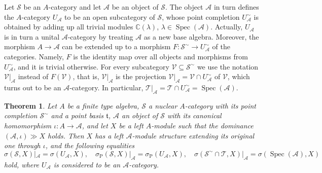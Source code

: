 \documentclass[12pt]{amsart}%
\newtheorem{theorem}{Theorem}
\theoremstyle{plain}
\numberwithin{equation}{section}
\numberwithin{equation}{section}
\numberwithin{theorem}{section}
\numberwithin{lemma}{section}
\numberwithin{remark}{section}
\numberwithin{example}{section}
\numberwithin{proposition}{section}
\numberwithin{definition}{section}
\numberwithin{corollary}{section}
\begin{document}
Let $\mathcal{S}$ be an $A$-category and let $\mathcal{A}$ be an object of
$\mathcal{S}$. The object $\mathcal{A}$ in turn defines the $A$-category
$U_{\mathcal{A}}$ to be an open subcategory of $\mathcal{S}$, whose point
completion $U_{\mathcal{A}}^{\sim}$ is obtained by adding up all trivial
modules $\mathbb{C}\left(  \lambda\right)  $, $\lambda\in\operatorname{Spec}%
\left(  \mathcal{A}\right)  $. Actually, $U_{\mathcal{A}}$ is in turn a unital
$\mathcal{A}$-category by treating $\mathcal{A}$ as a new base algebra.
Moreover, the morphism $A\rightarrow\mathcal{A}$ can be extended up to a
morphism $F:\mathcal{S}^{\sim}\rightarrow U_{\mathcal{A}}^{\sim}$ of the
categories. Namely, $F$ is the identity map over all objects and morphisms
from $U_{\mathcal{A}}^{\sim}$, and it is trivial otherwise. For every
subcategory $\mathcal{V\subseteq S}^{\sim}$ we use the notation $\mathcal{V}%
|_{\mathcal{A}}$ instead of $F\left(  \mathcal{V}\right)  $, that is,
$\mathcal{V}|_{\mathcal{A}}$ is the projection $\mathcal{V}|_{\mathcal{A}%
}=\mathcal{V}\cap U_{\mathcal{A}}^{\sim}$ of $\mathcal{V}$, which turns out to
be an $\mathcal{A}$-category. In particular, $\mathcal{T}|_{\mathcal{A}%
}=\mathcal{T}\cap U_{\mathcal{A}}^{\sim}=\operatorname{Spec}\left(
\mathcal{A}\right)  $.

\begin{theorem}
\label{thSMT}Let $A$ be a finite type algebra, $\mathcal{S}$ a nuclear
$A$-category with its point completion $\mathcal{S}^{\sim}$ and a point basis
$\mathfrak{t}$, $\mathcal{A}$ an object of $\mathcal{S}$ with its canonical
homomorphism $\iota:A\rightarrow\mathcal{A}$, and let $X$ be a left $A$-module
such that the dominance $\left(  \mathcal{A},\iota\right)  \gg X$ holds. Then
$X$ has a left $\mathcal{A}$-module structure extending its original one
through $\iota$, and the following equalities
\[
\sigma\left(  \mathcal{S},X\right)  |_{\mathcal{A}}=\sigma\left(
U_{\mathcal{A}},X\right)  ,\quad\sigma_{\operatorname{P}}\left(
\mathcal{S},X\right)  |_{\mathcal{A}}=\sigma_{\operatorname{P}}\left(
U_{\mathcal{A}},X\right)  ,\quad\sigma\left(  \mathcal{S}^{\sim}%
\cap\mathcal{T},X\right)  |_{\mathcal{A}}=\sigma\left(  \operatorname{Spec}%
\left(  \mathcal{A}\right)  ,X\right)
\]
hold, where $U_{\mathcal{A}}$ is considered to be an $\mathcal{A}$-category.
\end{theorem}
\end{document}
